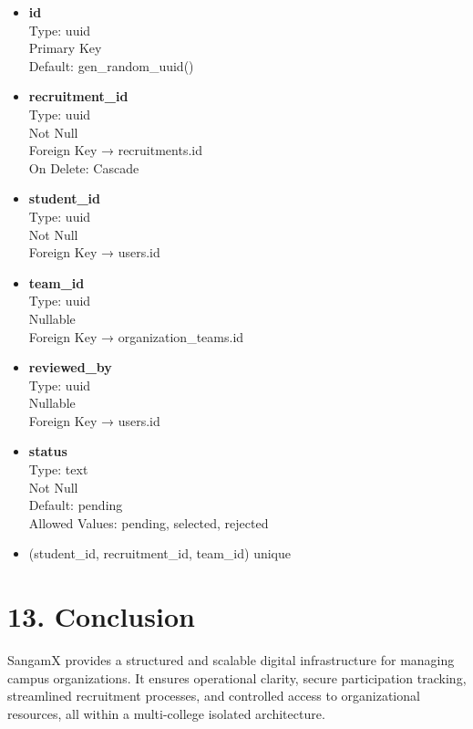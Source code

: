 \documentclass[12pt]{article}
\begin{document}
\begin{itemize}
    \item \textbf{id} \\
    Type: uuid \\
    Primary Key \\
    Default: gen\_random\_uuid()

    \item \textbf{recruitment\_id} \\
    Type: uuid \\
    Not Null \\
    Foreign Key → recruitments.id \\
    On Delete: Cascade

    \item \textbf{student\_id} \\
    Type: uuid \\
    Not Null \\
    Foreign Key → users.id

    \item \textbf{team\_id} \\
    Type: uuid \\
    Nullable \\
    Foreign Key → organization\_teams.id

    \item \textbf{reviewed\_by} \\
    Type: uuid \\
    Nullable \\
    Foreign Key → users.id

    \item \textbf{status} \\
    Type: text \\
    Not Null \\
    Default: pending \\
    Allowed Values: pending, selected, rejected

    \item (student\_id, recruitment\_id, team\_id) unique
\end{itemize}

\section*{13. Conclusion}

SangamX provides a structured and scalable digital infrastructure for managing campus organizations. It ensures operational clarity, secure participation tracking, streamlined recruitment processes, and controlled access to organizational resources, all within a multi-college isolated architecture.
\end{document}
